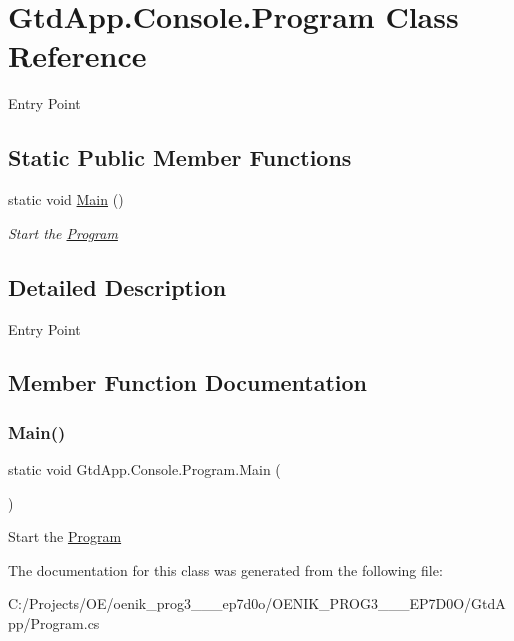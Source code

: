 \hypertarget{class_gtd_app_1_1_console_1_1_program}{}\section{Gtd\+App.\+Console.\+Program Class Reference}
\label{class_gtd_app_1_1_console_1_1_program}


Entry Point  


\subsection*{Static Public Member Functions}
\begin{DoxyCompactItemize}
\item 
static void \mbox{\hyperlink{class_gtd_app_1_1_console_1_1_program_a9906cbbdf79a33b84438bbfbfaecbfc6}{Main}} ()
\begin{DoxyCompactList}\small\item\em Start the \mbox{\hyperlink{class_gtd_app_1_1_console_1_1_program}{Program}} \end{DoxyCompactList}\end{DoxyCompactItemize}


\subsection{Detailed Description}
Entry Point 



\subsection{Member Function Documentation}
\mbox{\label{class_gtd_app_1_1_console_1_1_program_a9906cbbdf79a33b84438bbfbfaecbfc6}} 
\subsubsection{\texorpdfstring{Main()}{Main()}}
{\footnotesize\ttfamily static void Gtd\+App.\+Console.\+Program.\+Main (\begin{DoxyParamCaption}{ }\end{DoxyParamCaption})\hspace{0.3cm}{\ttfamily [static]}}



Start the \mbox{\hyperlink{class_gtd_app_1_1_console_1_1_program}{Program}} 



The documentation for this class was generated from the following file\+:\begin{DoxyCompactItemize}
\item 
C\+:/\+Projects/\+O\+E/oenik\+\_\+prog3\+\_\+\_\+\_\+ep7d0o/\+O\+E\+N\+I\+K\+\_\+\+P\+R\+O\+G3\+\_\+\_\+\_\+\+E\+P7\+D0\+O/\+Gtd\+App/Program.\+cs\end{DoxyCompactItemize}

